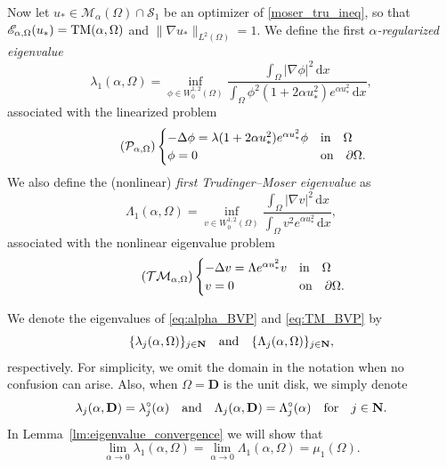 \documentclass[reqno,11pt]{amsart}
\theoremstyle{definition}
\newcommand{\ud}{\,\mathrm{d}}
\begin{document}
Now let $u_* \in \mathcal{M}_\alpha (\Omega) \cap \mathcal{S}_1$ be an 
optimizer of \eqref{moser_tru_ineq}, so that $\mathscr{E}_{\alpha, \Omega}(u_*) 
= {\rm TM}(\alpha, \Omega)$ and $\| \nabla u_* \|_{L^2(\Omega)} = 1$. We define
the first \emph{$\alpha$-regularized eigenvalue}
\begin{equation}\label{eq:alpha_eigenvalue}
\lambda_1(\alpha,\Omega) = \inf_{\phi \in W^{1,2}_0(\Omega)}\frac{\int_\Omega |\nabla \phi|^2 \ud x}
{\int_\Omega \phi^2(1+2\alpha u_*^2)e^{\alpha u_*^2} \ud x},
\end{equation}
associated with the linearized  problem 
\begin{equation}\label{eq:alpha_BVP}\tag{$\mathcal{P}_{\alpha,\Omega}$}
        \begin{cases}
			-\Delta \phi  = \lambda (1 + 2\alpha u_{*}^2) e^{\alpha u_{*}^2} \phi & \mbox{in} \quad\Omega\\
			\phi=0 & \mbox{on} \quad\partial \Omega.
		\end{cases}      
\end{equation}
We also define the (nonlinear) \emph{first Trudinger--Moser eigenvalue} as
\begin{equation}\label{eq:TM_eigenvalue}
    \Lambda_1(\alpha, \Omega) = \inf_{v \in W^{1,2}_0(\Omega)} 
    \frac{\int_\Omega |\nabla v|^2 \ud x}{\int_{\Omega}v^2e^{\alpha u_*^2}\ud x},
\end{equation}
associated with the nonlinear eigenvalue problem
\begin{equation}\label{eq:TM_BVP}\tag{$\mathcal{TM}_{\alpha,\Omega}$}
		 \begin{cases}
			-\Delta v = \Lambda  e^{\alpha u_{*}^2} v & \mbox{in} \quad \Omega\\
			v=0 & \mbox{on} \quad\partial \Omega.
		\end{cases} 
	\end{equation}

We denote the eigenvalues of \eqref{eq:alpha_BVP} and \eqref{eq:TM_BVP} by
\[
\{\lambda_j(\alpha,\Omega)\}_{j\in\mathbf{N}} \quad {\rm and} \quad \{\Lambda_j(\alpha,\Omega)\}_{j\in\mathbf{N}},
\]
respectively.
For simplicity, we omit the domain in the notation when no confusion can arise.
Also, when $\Omega=\mathbf{D}$ is the unit disk, we simply denote
\begin{equation}\label{eq:eigenvalue_linearized}
 \lambda_j(\alpha, \mathbf{D})=\lambda_j^\circ(\alpha) \quad {\rm and} 
 \quad \Lambda_j(\alpha,\mathbf{D})=\Lambda_j^\circ(\alpha) \quad {\rm for} \quad j\in\mathbf{N}.   
\end{equation}
In Lemma~\ref{lm:eigenvalue_convergence} we will show that 
\[\lim_{\alpha\to0}\lambda_1(\alpha,\Omega)=\lim_{\alpha\to0}\Lambda_1(\alpha,\Omega)=\mu_1(\Omega).
\]
\end{document}
